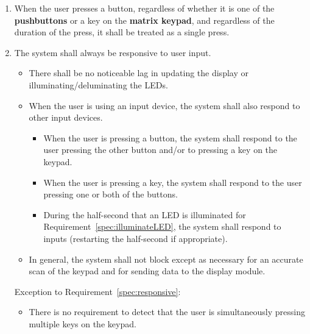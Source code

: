 \begin{enumerate}
    \item \label{spec:singleKeypress} When the user presses a button, regardless of whether it is one of the \textbf{pushbuttons} or a key on the \textbf{matrix keypad}, and regardless of the duration of the press, it shall be treated as a single press.
    \item \label{spec:responsive} The system shall always be responsive to user input.
        \begin{itemize}
            \item There shall be no noticeable lag in updating the display or illuminating/deluminating the LEDs.
            \item When the user is using an input device, the system shall also respond to other input devices.
                \begin{itemize}
                    \item When the user is pressing a button, the system shall respond to the user pressing the other button and/or to pressing a key on the keypad.
                    \item When the user is pressing a key, the system shall respond to the user pressing one or both of the buttons.
                    \item During the half-second that an LED is illuminated for Requirement~\ref{spec:illuminateLED}, the system shall respond to inputs (restarting the half-second if appropriate).
                \end{itemize}
            \item In general, the system shall not block except as necessary for an accurate scan of the keypad and for sending data to the display module.
        \end{itemize}
        Exception to Requirement~\ref{spec:responsive}:
        \begin{itemize}
            \item There is no requirement to detect that the user is simultaneously pressing multiple keys on the keypad.
        \end{itemize}
\end{enumerate}


